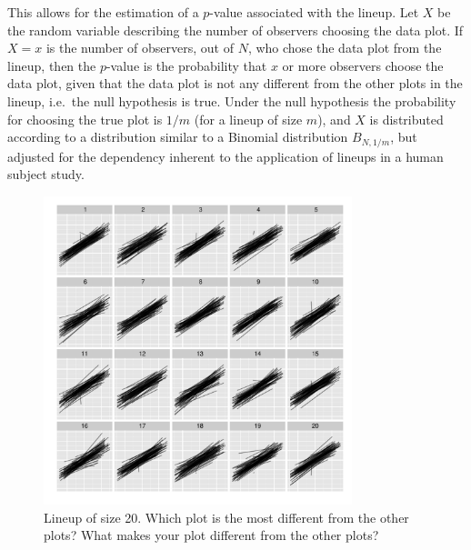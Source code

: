 \documentclass[12pt]{article} %
\newcommand{\hh}[1]{{\color{orange} #1}}
\newcommand{\al}[1]{{\color{ForestGreen} #1}}
\newcommand{\hhnote}[1]{\todo[inline,color=orange!40]{#1}}
\begin{document}
This  allows for the estimation of a $p$-value associated with the lineup.
 Let $X$ be the random variable describing  the number  of observers choosing the data plot. 
If $X=x$ is  the number of observers, out of $N$, who chose the data plot from the lineup, then the  $p$-value is  the probability that   $x$ or more observers choose the data plot, given that the data plot is not any different from the other plots in the lineup, i.e.~the null hypothesis is true. Under the null hypothesis the probability for choosing the true plot is $1/m$ (for a lineup of size $m$), and $X$ is distributed according to a distribution similar to a Binomial distribution $B_{N, 1/m}$, but adjusted for the dependency inherent to the application of lineups in a human subject study.

\begin{figure}
	\centering
	\includegraphics[width=0.8\textwidth]{normexam_fanned_lineup16.pdf}
	\caption{\label{fig:fanned} Lineup of size 20. Which plot is the most different from the other plots? What makes your plot different from the other plots?
	}
\end{figure}
\end{document}
